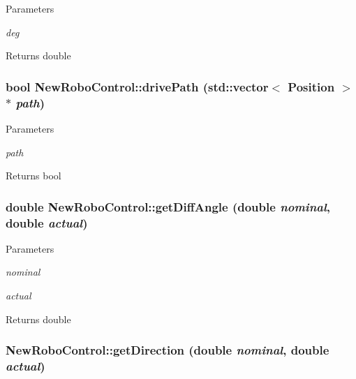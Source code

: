 \begin{DoxyParams}{Parameters}
\item[{\em deg}]\end{DoxyParams}
\begin{DoxyReturn}{Returns}
double 
\end{DoxyReturn}
\hypertarget{classNewRoboControl_a9816eae1b7c90dbb74a7e0365e2b57e9}{
\subsubsection[{drivePath}]{\setlength{\rightskip}{0pt plus 5cm}bool NewRoboControl::drivePath (std::vector$<$ Position $>$ $\ast$ {\em path})}}
\label{classNewRoboControl_a9816eae1b7c90dbb74a7e0365e2b57e9}

\begin{DoxyParams}{Parameters}
\item[{\em path}]\end{DoxyParams}
\begin{DoxyReturn}{Returns}
bool 
\end{DoxyReturn}
\hypertarget{classNewRoboControl_a960c714f4f8828d16dc955c871affbb5}{
\subsubsection[{getDiffAngle}]{\setlength{\rightskip}{0pt plus 5cm}double NewRoboControl::getDiffAngle (double {\em nominal}, \/  double {\em actual})}}
\label{classNewRoboControl_a960c714f4f8828d16dc955c871affbb5}

\begin{DoxyParams}{Parameters}
\item[{\em nominal}]\item[{\em actual}]\end{DoxyParams}
\begin{DoxyReturn}{Returns}
double 
\end{DoxyReturn}
\hypertarget{classNewRoboControl_a9979ccfbc622d9082fb034caf36c514b}{
\subsubsection[{getDirection}]{ NewRoboControl::getDirection (double {\em nominal}, \/  double {\em actual})}}
\label{classNewRoboControl_a9979ccfbc622d9082fb034caf36c514b}

